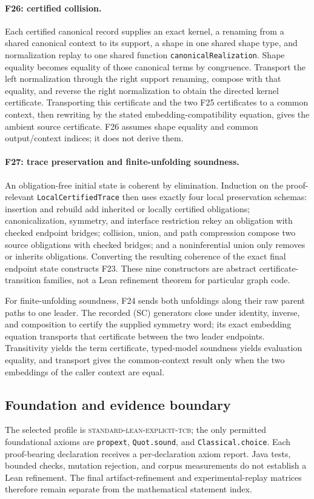 \paragraph{F26: certified collision.}
\label{app:proof-F26}
Each certified canonical record supplies an exact kernel, a renaming from a
shared canonical context to its support, a shape in one shared shape type,
and normalization replay to one shared function
\texttt{canonicalRealization}.  Shape equality becomes equality of those
canonical terms by congruence.  Transport the left normalization through the
right support renaming, compose with that equality, and reverse the right
normalization to obtain the directed kernel certificate.  Transporting this
certificate and the two F25 certificates to a common context, then rewriting
by the stated embedding-compatibility equation, gives the ambient source
certificate.  F26 assumes shape equality and common output/context indices;
it does not derive them.

\paragraph{F27: trace preservation and finite-unfolding soundness.}
\label{app:proof-F27}
An obligation-free initial state is coherent by elimination.  Induction on
the proof-relevant \texttt{LocalCertifiedTrace} then uses exactly four local
preservation schemas: insertion and rebuild add inherited or locally
certified obligations; canonicalization, symmetry, and interface restriction
rekey an obligation with checked endpoint bridges; collision, union, and path
compression compose two source obligations with checked bridges; and a
noninferential union only removes or inherits obligations.  Converting the
resulting coherence of the exact final endpoint state constructs F23.  These
nine constructors are abstract certificate-transition families, not a Lean
refinement theorem for particular graph code.

For finite-unfolding soundness, F24 sends both unfoldings along their raw
parent paths to one leader.  The recorded (SC) generators close under
identity, inverse, and composition to certify the supplied symmetry word; its
exact embedding equation transports that certificate between the two leader
endpoints.  Transitivity yields the term certificate, typed-model soundness
yields evaluation equality, and transport gives the common-context result
only when the two embeddings of the caller context are equal.

\subsection{Foundation and evidence boundary}

The selected profile is \textsc{standard-lean-explicit-tcb}; the only
permitted foundational axioms are \texttt{propext}, \texttt{Quot.sound}, and
\texttt{Classical.choice}.  Each proof-bearing declaration receives a
per-declaration axiom report.  Java tests, bounded checks, mutation rejection,
and corpus measurements do not establish a Lean refinement.  The final
artifact-refinement and experimental-replay matrices therefore remain
separate from the mathematical statement index.


